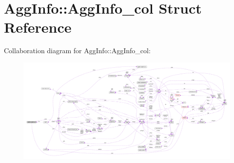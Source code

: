 \hypertarget{struct_agg_info_1_1_agg_info__col}{\section{Agg\-Info\-:\-:Agg\-Info\-\_\-col Struct Reference}
\label{struct_agg_info_1_1_agg_info__col}
}


Collaboration diagram for Agg\-Info\-:\-:Agg\-Info\-\_\-col\-:\nopagebreak
\begin{figure}[H]
\begin{center}
\leavevmode
\includegraphics[width=350pt]{struct_agg_info_1_1_agg_info__col__coll__graph}
\end{center}
\end{figure}
